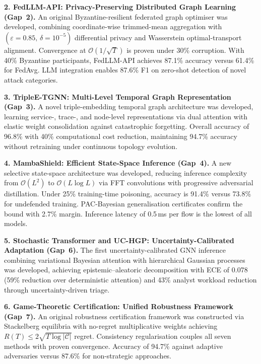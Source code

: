 \noindent\textbf{2. FedLLM-API: Privacy-Preserving Distributed Graph Learning (Gap~2).}
An original Byzantine-resilient federated graph optimiser was developed, combining coordinate-wise trimmed-mean aggregation with $(\varepsilon{=}0.85,\,\delta{=}10^{-5})$ differential privacy and Wasserstein optimal-transport alignment. Convergence at $\mathcal{O}(1/\sqrt{T})$ is proven under 30\% corruption. With 40\% Byzantine participants, FedLLM-API achieves 87.1\% accuracy versus 61.4\% for FedAvg. LLM integration enables 87.6\% F1 on zero-shot detection of novel attack categories.

\noindent\textbf{3. TripleE-TGNN: Multi-Level Temporal Graph Representation (Gap~3).}
A novel triple-embedding temporal graph architecture was developed, learning service-, trace-, and node-level representations via dual attention with elastic weight consolidation against catastrophic forgetting. Overall accuracy of 96.8\% with 40\% computational cost reduction, maintaining 94.7\% accuracy without retraining under continuous topology evolution.

\noindent\textbf{4. MambaShield: Efficient State-Space Inference (Gap~4).}
A new selective state-space architecture was developed, reducing inference complexity from $\mathcal{O}(L^{2})$ to $\mathcal{O}(L\log L)$ via FFT convolutions with progressive adversarial distillation. Under 25\% training-time poisoning, accuracy is 91.4\% versus 73.8\% for undefended training. PAC-Bayesian generalisation certificates confirm the bound with 2.7\% margin. Inference latency of 0.5\,ms per flow is the lowest of all models.

\noindent\textbf{5. Stochastic Transformer and UC-HGP: Uncertainty-Calibrated Adaptation (Gap~6).}
The first uncertainty-calibrated GNN inference combining variational Bayesian attention with hierarchical Gaussian processes was developed, achieving epistemic--aleatoric decomposition with ECE of 0.078 (59\% reduction over deterministic attention) and 43\% analyst workload reduction through uncertainty-driven triage.

\noindent\textbf{6. Game-Theoretic Certification: Unified Robustness Framework (Gap~7).}
An original robustness certification framework was constructed via Stackelberg equilibria with no-regret multiplicative weights achieving $R(T)\leq 2\sqrt{T\log|\mathcal{C}|}$ regret. Consistency regularisation couples all seven methods with proven convergence. Accuracy of 94.7\% against adaptive adversaries versus 87.6\% for non-strategic approaches.

